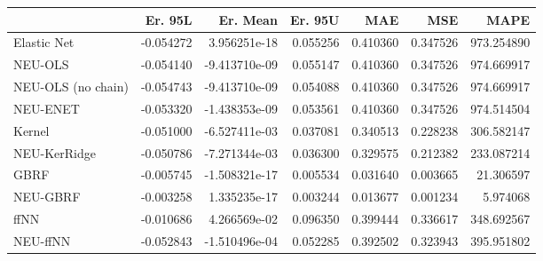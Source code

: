 \begin{tabular}{lrrrrrr}
\toprule
{} &   Er. 95L &      Er. Mean &   Er. 95U &       MAE &       MSE &        MAPE \\
\midrule
Elastic Net        & -0.054272 &  3.956251e-18 &  0.055256 &  0.410360 &  0.347526 &  973.254890 \\
NEU-OLS            & -0.054140 & -9.413710e-09 &  0.055147 &  0.410360 &  0.347526 &  974.669917 \\
NEU-OLS (no chain) & -0.054743 & -9.413710e-09 &  0.054088 &  0.410360 &  0.347526 &  974.669917 \\
NEU-ENET           & -0.053320 & -1.438353e-09 &  0.053561 &  0.410360 &  0.347526 &  974.514504 \\
Kernel             & -0.051000 & -6.527411e-03 &  0.037081 &  0.340513 &  0.228238 &  306.582147 \\
NEU-KerRidge       & -0.050786 & -7.271344e-03 &  0.036300 &  0.329575 &  0.212382 &  233.087214 \\
GBRF               & -0.005745 & -1.508321e-17 &  0.005534 &  0.031640 &  0.003665 &   21.306597 \\
NEU-GBRF           & -0.003258 &  1.335235e-17 &  0.003244 &  0.013677 &  0.001234 &    5.974068 \\
ffNN               & -0.010686 &  4.266569e-02 &  0.096350 &  0.399444 &  0.336617 &  348.692567 \\
NEU-ffNN           & -0.052843 & -1.510496e-04 &  0.052285 &  0.392502 &  0.323943 &  395.951802 \\
\bottomrule
\end{tabular}
